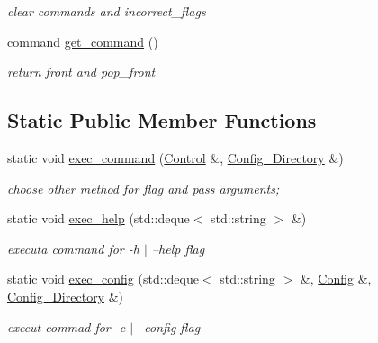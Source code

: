 \begin{DoxyCompactItemize}
\begin{DoxyCompactList}\small\item\em clear commands and incorrect\+\_\+flags \end{DoxyCompactList}\item 
\mbox{\label{class_control_a3ce5920b84869542d1b5bca6ea925abc}} 
command \mbox{\hyperlink{class_control_a3ce5920b84869542d1b5bca6ea925abc}{get\+\_\+command}} ()
\begin{DoxyCompactList}\small\item\em return front and pop\+\_\+front \end{DoxyCompactList}\end{DoxyCompactItemize}
\subsection*{Static Public Member Functions}
\begin{DoxyCompactItemize}
\item 
\mbox{\label{class_control_a280ccb1e36613b727231c8d38a4c6dad}} 
static void \mbox{\hyperlink{class_control_a280ccb1e36613b727231c8d38a4c6dad}{exec\+\_\+command}} (\mbox{\hyperlink{class_control}{Control}} \&, \mbox{\hyperlink{class_config___directory}{Config\+\_\+\+Directory}} \&)
\begin{DoxyCompactList}\small\item\em choose other method for flag and pass arguments; \end{DoxyCompactList}\item 
\mbox{\label{class_control_aa17c212eab1ec668968dafad931c0520}} 
static void \mbox{\hyperlink{class_control_aa17c212eab1ec668968dafad931c0520}{exec\+\_\+help}} (std\+::deque$<$ std\+::string $>$ \&)
\begin{DoxyCompactList}\small\item\em executa command for -\/h $\vert$ --help flag \end{DoxyCompactList}\item 
\mbox{\label{class_control_afb6e016e356c5203f7cb427f688bf3c2}} 
static void \mbox{\hyperlink{class_control_afb6e016e356c5203f7cb427f688bf3c2}{exec\+\_\+config}} (std\+::deque$<$ std\+::string $>$ \&, \mbox{\hyperlink{class_config}{Config}} \&, \mbox{\hyperlink{class_config___directory}{Config\+\_\+\+Directory}} \&)
\begin{DoxyCompactList}\small\item\em execut commad for -\/c $\vert$ --config flag \end{DoxyCompactList}\end{DoxyCompactItemize}
